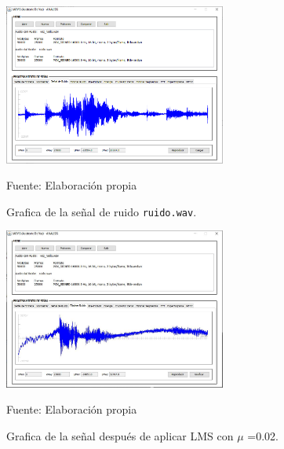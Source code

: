 \begin{figure}[H]
\begin{center}
\includegraphics[width=0.65\textwidth]{Imagenes/Cap3/image078}
\end{center}
\begin{center}
\vskip -0.5cm
\caption{\small{Grafica de la señal de ruido \texttt{ruido.wav}.}}
\label{fig:figura3.78}
{\small{Fuente: Elaboración propia}}
\end{center}
\end{figure}

\begin{figure}[H]
\begin{center}
\includegraphics[width=0.65\textwidth]{Imagenes/Cap3/image079}
\end{center}
\begin{center}
\vskip -0.5cm
\caption{\small{Grafica de la señal después de aplicar LMS con $\mu$ =0.02.}}
\label{fig:figura3.79}
{\small{Fuente: Elaboración propia}}
\end{center}
\end{figure}

\vskip -1cm

